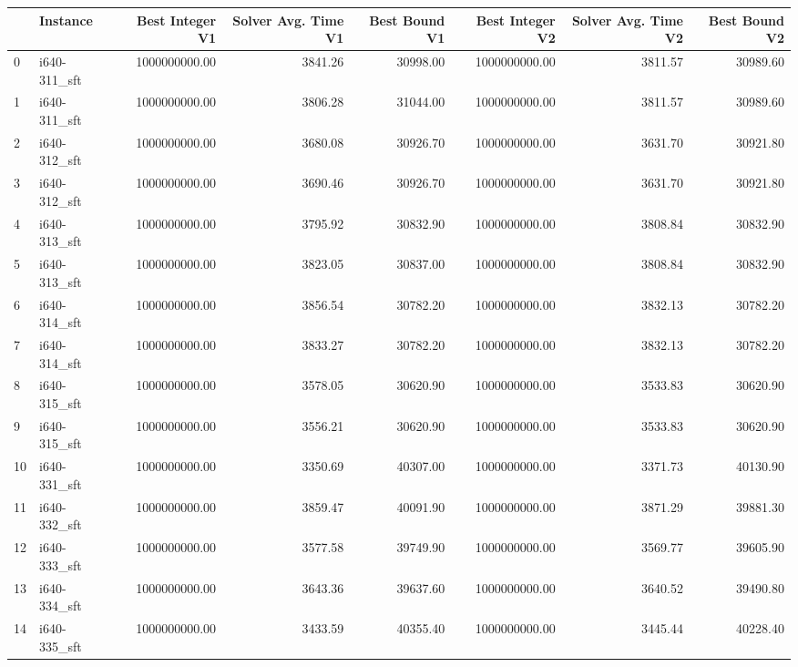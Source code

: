 \begin{tabular}{llrrrrrr}
\toprule
{} &      Instance &  Best Integer V1 &  Solver Avg. Time V1 &  Best Bound V1 &  Best Integer V2 &  Solver Avg. Time V2 &  Best Bound V2 \\
\midrule
0  &  i640-311\_sft &    1000000000.00 &              3841.26 &       30998.00 &    1000000000.00 &              3811.57 &       30989.60 \\
1  &  i640-311\_sft &    1000000000.00 &              3806.28 &       31044.00 &    1000000000.00 &              3811.57 &       30989.60 \\
2  &  i640-312\_sft &    1000000000.00 &              3680.08 &       30926.70 &    1000000000.00 &              3631.70 &       30921.80 \\
3  &  i640-312\_sft &    1000000000.00 &              3690.46 &       30926.70 &    1000000000.00 &              3631.70 &       30921.80 \\
4  &  i640-313\_sft &    1000000000.00 &              3795.92 &       30832.90 &    1000000000.00 &              3808.84 &       30832.90 \\
5  &  i640-313\_sft &    1000000000.00 &              3823.05 &       30837.00 &    1000000000.00 &              3808.84 &       30832.90 \\
6  &  i640-314\_sft &    1000000000.00 &              3856.54 &       30782.20 &    1000000000.00 &              3832.13 &       30782.20 \\
7  &  i640-314\_sft &    1000000000.00 &              3833.27 &       30782.20 &    1000000000.00 &              3832.13 &       30782.20 \\
8  &  i640-315\_sft &    1000000000.00 &              3578.05 &       30620.90 &    1000000000.00 &              3533.83 &       30620.90 \\
9  &  i640-315\_sft &    1000000000.00 &              3556.21 &       30620.90 &    1000000000.00 &              3533.83 &       30620.90 \\
10 &  i640-331\_sft &    1000000000.00 &              3350.69 &       40307.00 &    1000000000.00 &              3371.73 &       40130.90 \\
11 &  i640-332\_sft &    1000000000.00 &              3859.47 &       40091.90 &    1000000000.00 &              3871.29 &       39881.30 \\
12 &  i640-333\_sft &    1000000000.00 &              3577.58 &       39749.90 &    1000000000.00 &              3569.77 &       39605.90 \\
13 &  i640-334\_sft &    1000000000.00 &              3643.36 &       39637.60 &    1000000000.00 &              3640.52 &       39490.80 \\
14 &  i640-335\_sft &    1000000000.00 &              3433.59 &       40355.40 &    1000000000.00 &              3445.44 &       40228.40 \\
\bottomrule
\end{tabular}
